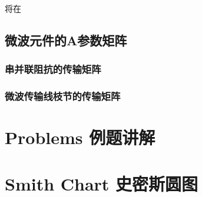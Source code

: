     将在
\subsection{微波元件的A参数矩阵}
    \subsubsection{串并联阻抗的传输矩阵}
    \subsubsection{微波传输线枝节的传输矩阵}
\section{Problems 例题讲解}
\section{Smith Chart 史密斯圆图}
